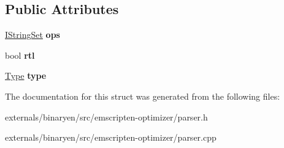 \subsection*{Public Attributes}
\begin{DoxyCompactItemize}
\item 
\mbox{\label{structcashew_1_1_operator_class_a7d00086e774d9bc54fb3ddf2ee79f511}} 
\mbox{\hyperlink{classcashew_1_1_i_string_set}{I\+String\+Set}} {\bfseries ops}
\item 
\mbox{\label{structcashew_1_1_operator_class_ae52e44785dc10d6fc0baccf6514ee47a}} 
bool {\bfseries rtl}
\item 
\mbox{\label{structcashew_1_1_operator_class_af3618f0b7e762f6e5b476fd14bfb1b2a}} 
\mbox{\hyperlink{struct_type}{Type}} {\bfseries type}
\end{DoxyCompactItemize}


The documentation for this struct was generated from the following files\+:\begin{DoxyCompactItemize}
\item 
externals/binaryen/src/emscripten-\/optimizer/parser.\+h\item 
externals/binaryen/src/emscripten-\/optimizer/parser.\+cpp\end{DoxyCompactItemize}
